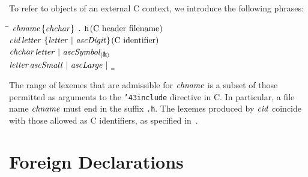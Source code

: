 To refer to objects of an external C context, we introduce the following
phrases:
%
\begin{flushleft}\it\begin{tabbing}
\hspace{0.6in}\=\hspace{3.1in}\=\kill
$\it chname$\>\makebox[3.5em]{$\rightarrow$}$\it \{chchar\}\ \makebox{\tt .}\ \makebox{\tt h}$\>\makebox[3em]{}$\it (\tr{C\ header\ filename})$\\ 
$\it cid$\>\makebox[3.5em]{$\rightarrow$}$\it letter\ \{letter\ |\ ascDigit\}$\>\makebox[3em]{}$\it (\mbox{{\rm C\ identifier}})$\\ 
$\it chchar$\>\makebox[3.5em]{$\rightarrow$}$\it letter\ |\ ascSymbol_{\langle{}\makebox{\tt {\char'46}}\rangle{}}$\\ 
$\it letter$\>\makebox[3.5em]{$\rightarrow$}$\it ascSmall\ |\ ascLarge\ |\ \makebox{\tt {\char'137}}$
\end{tabbing}\end{flushleft}
%
The range of lexemes that are admissible for \mbox{$\it chname$} is a subset of
those permitted as arguments to the \mbox{\tt {\char'43}include} directive in C.  In
particular, a file name \mbox{$\it chname$} must end in the suffix \mbox{\tt .h}.  The
lexemes produced by \mbox{$\it cid$} coincide with those allowed as C identifiers,
as specified in~\cite{C}.

\section{Foreign Declarations}

